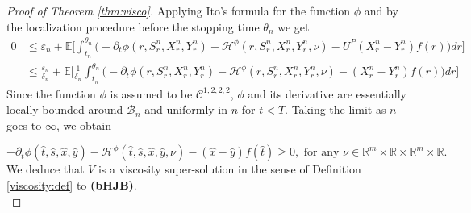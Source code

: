 \documentclass[10pt,a4paper]{amsart}
\newcommand{\E}{\mathbb{E}}
\begin{document}
\begin{proof}[Proof of Theorem \ref{thm:visco}]
Applying Ito's formula for the function $\phi$ and by the localization procedure before the stopping time $\theta_n$ we get
\begin{align*}
0&\leq \varepsilon_n+ \E\bigl[\int_{t_n}^{\theta_n}\big( -\partial_t \phi(r,S_r^n,X_r^n,Y_r^n)- \mathcal H^\phi(r,S_r^n,X_r^n,Y_r^n,\nu)-U^P(X_{r}^{n} - Y^{n}_r) f(r)\big)dr \bigl]\\
&\leq \frac{\varepsilon_n}{\delta_n}+ \E\bigl[\frac1{\delta_n}\int_{t_n}^{\theta_n}\big( -\partial_t \phi(r,S_r^n,X_r^n,Y_r^n)- \mathcal H^\phi(r,S_r^n,X_r^n,Y_r^n,\nu)-(X_{r}^{n} - Y^{n}_r) f(r)\big)dr \bigl]
\end{align*}
Since the function $\phi$ is assumed to be $\mathcal C^{1,2,2,2}$, $\phi$ and its derivative are essentially locally bounded around $\mathcal B_n$ and uniformly in $n$ for $t<T$. Taking the limit as $n$ goes to $\infty$, we obtain 

\[-\partial_t \phi(\hat t,\hat s,\hat x,\hat y)- \mathcal H^\phi(\hat t,\hat s,\hat x,\hat y,\nu)-(\hat x - \hat y) f(\hat t)\geq 0,\text{ for any }\nu\in \mathbb R^{m}\times\mathbb R\times \mathbb R^m\times \mathbb R.\]
We deduce that $V$ is a viscosity super-solution in the sense of Definition \ref{viscosity:def} to \textbf{(bHJB)}.\\


\end{proof}
\end{document}
